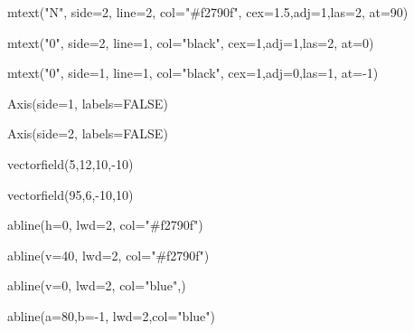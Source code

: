 \documentclass[
  a4paper,
]{scrbook}
\newenvironment{Shaded}{\begin{snugshade}}{\end{snugshade}}
\newcommand{\AttributeTok}[1]{\textcolor[rgb]{0.40,0.45,0.13}{#1}}
\newcommand{\ConstantTok}[1]{\textcolor[rgb]{0.56,0.35,0.01}{#1}}
\newcommand{\DecValTok}[1]{\textcolor[rgb]{0.68,0.00,0.00}{#1}}
\newcommand{\FloatTok}[1]{\textcolor[rgb]{0.68,0.00,0.00}{#1}}
\newcommand{\FunctionTok}[1]{\textcolor[rgb]{0.28,0.35,0.67}{#1}}
\newcommand{\NormalTok}[1]{\textcolor[rgb]{0.00,0.23,0.31}{#1}}
\newcommand{\SpecialCharTok}[1]{\textcolor[rgb]{0.37,0.37,0.37}{#1}}
\newcommand{\StringTok}[1]{\textcolor[rgb]{0.13,0.47,0.30}{#1}}
\theoremstyle{definition}
\theoremstyle{remark}
\begin{document}
\begin{Shaded}
\begin{Highlighting}[]
\FunctionTok{mtext}\NormalTok{(}\StringTok{"N"}\NormalTok{, }\AttributeTok{side=}\DecValTok{2}\NormalTok{, }\AttributeTok{line=}\DecValTok{2}\NormalTok{, }\AttributeTok{col=}\StringTok{"\#f2790f"}\NormalTok{, }\AttributeTok{cex=}\FloatTok{1.5}\NormalTok{,}\AttributeTok{adj=}\DecValTok{1}\NormalTok{,}\AttributeTok{las=}\DecValTok{2}\NormalTok{, }\AttributeTok{at=}\DecValTok{90}\NormalTok{)}

\FunctionTok{mtext}\NormalTok{(}\StringTok{"0"}\NormalTok{, }\AttributeTok{side=}\DecValTok{2}\NormalTok{, }\AttributeTok{line=}\DecValTok{1}\NormalTok{, }\AttributeTok{col=}\StringTok{"black"}\NormalTok{, }\AttributeTok{cex=}\DecValTok{1}\NormalTok{,}\AttributeTok{adj=}\DecValTok{1}\NormalTok{,}\AttributeTok{las=}\DecValTok{2}\NormalTok{, }\AttributeTok{at=}\DecValTok{0}\NormalTok{)}

\FunctionTok{mtext}\NormalTok{(}\StringTok{"0"}\NormalTok{, }\AttributeTok{side=}\DecValTok{1}\NormalTok{, }\AttributeTok{line=}\DecValTok{1}\NormalTok{, }\AttributeTok{col=}\StringTok{"black"}\NormalTok{, }\AttributeTok{cex=}\DecValTok{1}\NormalTok{,}\AttributeTok{adj=}\DecValTok{0}\NormalTok{,}\AttributeTok{las=}\DecValTok{1}\NormalTok{, }\AttributeTok{at=}\SpecialCharTok{{-}}\DecValTok{1}\NormalTok{)}

\FunctionTok{Axis}\NormalTok{(}\AttributeTok{side=}\DecValTok{1}\NormalTok{, }\AttributeTok{labels=}\ConstantTok{FALSE}\NormalTok{)}

\FunctionTok{Axis}\NormalTok{(}\AttributeTok{side=}\DecValTok{2}\NormalTok{, }\AttributeTok{labels=}\ConstantTok{FALSE}\NormalTok{)}

\FunctionTok{vectorfield}\NormalTok{(}\DecValTok{5}\NormalTok{,}\DecValTok{12}\NormalTok{,}\DecValTok{10}\NormalTok{,}\SpecialCharTok{{-}}\DecValTok{10}\NormalTok{)}

\FunctionTok{vectorfield}\NormalTok{(}\DecValTok{95}\NormalTok{,}\DecValTok{6}\NormalTok{,}\SpecialCharTok{{-}}\DecValTok{10}\NormalTok{,}\DecValTok{10}\NormalTok{)}

 \FunctionTok{abline}\NormalTok{(}\AttributeTok{h=}\DecValTok{0}\NormalTok{, }\AttributeTok{lwd=}\DecValTok{2}\NormalTok{, }\AttributeTok{col=}\StringTok{"\#f2790f"}\NormalTok{)}

 \FunctionTok{abline}\NormalTok{(}\AttributeTok{v=}\DecValTok{40}\NormalTok{, }\AttributeTok{lwd=}\DecValTok{2}\NormalTok{, }\AttributeTok{col=}\StringTok{"\#f2790f"}\NormalTok{)}

 \FunctionTok{abline}\NormalTok{(}\AttributeTok{v=}\DecValTok{0}\NormalTok{, }\AttributeTok{lwd=}\DecValTok{2}\NormalTok{, }\AttributeTok{col=}\StringTok{"blue"}\NormalTok{,)}

 \FunctionTok{abline}\NormalTok{(}\AttributeTok{a=}\DecValTok{80}\NormalTok{,}\AttributeTok{b=}\SpecialCharTok{{-}}\DecValTok{1}\NormalTok{, }\AttributeTok{lwd=}\DecValTok{2}\NormalTok{,}\AttributeTok{col=}\StringTok{"blue"}\NormalTok{)}
\end{Highlighting}
\end{Shaded}
\end{document}

